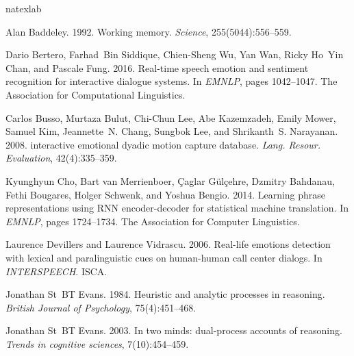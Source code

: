 \documentclass[11pt,a4paper]{article}
\begin{document}
\begin{thebibliography}{45}
  \expandafter\ifx\csname natexlab\endcsname\relax\def\natexlab#1{#1}\fi
  
  Alan Baddeley. 1992.
  \newblock Working memory.
  \newblock \emph{Science}, 255(5044):556--559.
  
  Dario Bertero, Farhad~Bin Siddique, Chien{-}Sheng Wu, Yan Wan, Ricky Ho~Yin
    Chan, and Pascale Fung. 2016.
  \newblock Real-time speech emotion and sentiment recognition for interactive
    dialogue systems.
  \newblock In \emph{{EMNLP}}, pages 1042--1047. The Association for
    Computational Linguistics.
  
  Carlos Busso, Murtaza Bulut, Chi{-}Chun Lee, Abe Kazemzadeh, Emily Mower,
    Samuel Kim, Jeannette~N. Chang, Sungbok Lee, and Shrikanth~S. Narayanan.
    2008.
   interactive emotional dyadic motion capture database.
  \newblock \emph{Lang. Resour. Evaluation}, 42(4):335--359.
  
  Kyunghyun Cho, Bart van Merrienboer, {\c{C}}aglar G{\"{u}}l{\c{c}}ehre, Dzmitry
    Bahdanau, Fethi Bougares, Holger Schwenk, and Yoshua Bengio. 2014.
  \newblock Learning phrase representations using {RNN} encoder-decoder for
    statistical machine translation.
  \newblock In \emph{{EMNLP}}, pages 1724--1734. The Association for Computer
    Linguistics.
  
  Laurence Devillers and Laurence Vidrascu. 2006.
  \newblock Real-life emotions detection with lexical and paralinguistic cues on
    human-human call center dialogs.
  \newblock In \emph{{INTERSPEECH}}. {ISCA}.
  
  Jonathan St~BT Evans. 1984.
  \newblock Heuristic and analytic processes in reasoning.
  \newblock \emph{British Journal of Psychology}, 75(4):451--468.
  
  Jonathan St~BT Evans. 2003.
  \newblock In two minds: dual-process accounts of reasoning.
  \newblock \emph{Trends in cognitive sciences}, 7(10):454--459.
  

\end{thebibliography}
\end{document}
